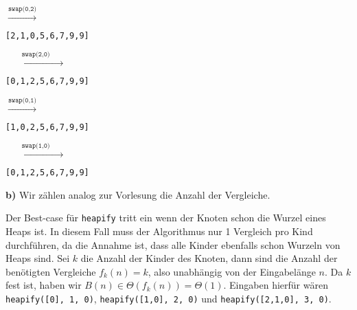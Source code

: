 \documentclass[a4paper,graphics,11pt]{article}
\begin{document}
$\xrightarrow{\texttt{swap(0,2)}}$
\begin{minipage}{0.3\textwidth}
    \texttt{[2,1,0,5,6,7,9,9]}\\
\end{minipage}
$\xrightarrow{\qquad\texttt{swap(2,0)}\qquad}$
\begin{minipage}{0.3\textwidth}
    \texttt{[0,1,2,5,6,7,9,9]}\\
    \begin{center}
    \end{center}
\end{minipage}

$\xrightarrow{\texttt{swap(0,1)}}$
\begin{minipage}{0.3\textwidth}
    \texttt{[1,0,2,5,6,7,9,9]}\\
    \begin{center}
    \end{center}
\end{minipage}
$\xrightarrow{\qquad\texttt{swap(1,0)}\qquad}$
\begin{minipage}{0.3\textwidth}
    \texttt{[0,1,2,5,6,7,9,9]}\\
    \begin{center}
    \end{center}
\end{minipage}

\textbf{b)}
Wir zählen analog zur Vorlesung die Anzahl der Vergleiche.

Der Best-case für \texttt{heapify} tritt ein wenn der Knoten schon die
Wurzel eines Heaps ist. In diesem Fall muss der Algorithmus nur 1 Vergleich pro Kind durchführen, da die Annahme ist,
dass alle Kinder ebenfalls schon Wurzeln von Heaps sind.
Sei $k$ die Anzahl der Kinder des Knoten, dann sind die Anzahl der benötigten Vergleiche $f_k(n) = k$, also
unabhängig von der Eingabelänge $n$. Da $k$ fest ist, haben wir $B(n) \in \Theta(f_k(n)) = \Theta(1)$.
Eingaben hierfür wären \texttt{heapify([0], 1, 0)}, \texttt{heapify([1,0], 2, 0)} und \texttt{heapify([2,1,0], 3, 0)}.
\end{document}

